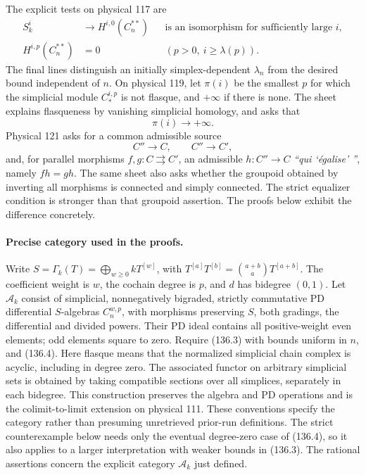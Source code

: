 \documentclass[11pt,a4paper]{article}
\theoremstyle{definition}\newtheorem{definition}[theorem]{Definition}
\theoremstyle{remark}\newtheorem{remark}[theorem]{Remark}
\begin{document}
The explicit tests on physical 117 are
\begin{equation}
 \begin{aligned}
 S_k^i&\longrightarrow H^{i,0}(C_n^{**})
  &&\text{is an isomorphism for sufficiently large }i,\\
 H^{i,p}(C_n^{**})&=0
  &&(p>0,\ i\geq\lambda(p)).
 \end{aligned}                                           \tag{136.3}
\end{equation}
The final lines distinguish an initially simplex-dependent
$\lambda_n$ from the desired bound independent of $n$.
On physical 119, let $\pi(i)$ be the smallest $p$ for which the
simplicial module $C_*^{i,p}$ is not flasque, and $+\infty$ if
there is none.  The sheet explains flasqueness by vanishing
simplicial homology, and asks that
\[
                         \pi(i)\longrightarrow+\infty.
                                                               \tag{136.4}
\]
Physical 121 asks for a common admissible source
\[
 C''\longrightarrow C,\qquad C''\longrightarrow C',              \tag{136.a}
\]
and, for parallel morphisms $f,g:C\rightrightarrows C'$, an
admissible $h:C''\to C$ \emph{``qui `\'egalise' ''}, namely
$fh=gh$.  The same sheet also asks whether the groupoid obtained
by inverting all morphisms is connected and simply connected.
The strict equalizer condition is stronger than that groupoid
assertion.  The proofs below exhibit the difference concretely.

\paragraph{Precise category used in the proofs.}
Write $S=\Gamma_k(T)=\bigoplus_{w\geq0}kT^{[w]}$, with
$T^{[a]}T^{[b]}=\binom{a+b}{a}T^{[a+b]}$.
The coefficient weight is $w$, the cochain degree is $p$, and
$d$ has bidegree $(0,1)$.  Let $\mathcal A_k$ consist of simplicial,
nonnegatively bigraded, strictly commutative PD differential
$S$-algebras $C_n^{w,p}$, with morphisms preserving $S$, both
gradings, the differential and divided powers.  Their PD ideal
contains all positive-weight even elements; odd elements square
to zero.  Require (136.3) with bounds uniform in $n$, and
(136.4).  Here flasque means that the normalized simplicial
chain complex is acyclic, including in degree zero.
The associated functor on arbitrary simplicial sets is obtained
by taking compatible sections over all simplices, separately in
each bidegree.  This construction preserves the algebra and PD
operations and is the colimit-to-limit extension on physical 111.
These conventions specify the category rather than presuming
unretrieved prior-run definitions.  The strict counterexample
below needs only the eventual degree-zero case of (136.4), so
it also applies to a larger interpretation with weaker bounds
in (136.3).  The rational assertions concern the explicit
category $\mathcal A_k$ just defined.
\end{document}
